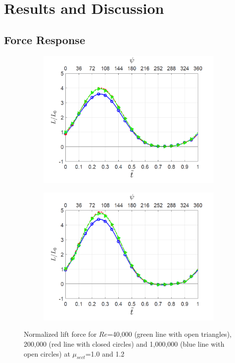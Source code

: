 \section{Results and Discussion}

\subsection{Force Response}

\begin{figure}[H]
	\begin{subfigure}{0.5\textwidth}
		\includegraphics[width=1\textwidth]{figures/lift_Re_effect_lambda_1pt0.png}
		\label{fig:lift_Re_comparision_lambda_1p0}
	\end{subfigure}
 	\begin{subfigure}{0.5\textwidth}
		\includegraphics[width=1\textwidth]{figures/lift_Re_effect_lambda_1pt2.png}
		\label{fig:lift_Re_comparision_lambda_1p2}
	\end{subfigure}

 	\caption{Normalized lift force for $Re$=40,000 (green line with open triangles), 200,000 (red line with closed circles) and 1,000,000 (blue line with open circles) at $\mu_{sect}$=1.0 and 1.2}
 	\label{fig:lift_comparison}
\end{figure}

